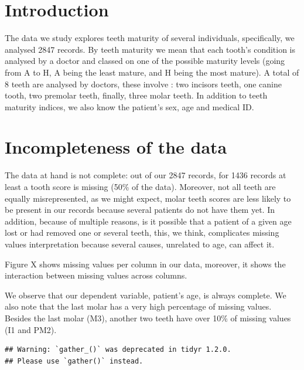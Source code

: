 \documentclass[11pt,]{article}
\begin{document}
\vskip -8.5pt



\noindent  

\hypertarget{introduction}{%
\section{Introduction}\label{introduction}}

The data we study explores teeth maturity of several individuals,
specifically, we analysed 2847 records. By teeth maturity we mean that
each tooth's condition is analysed by a doctor and classed on one of the
possible maturity levels (going from A to H, A being the least mature,
and H being the most mature). A total of 8 teeth are analysed by
doctors, these involve : two incisors teeth, one canine tooth, two
premolar teeth, finally, three molar teeth. In addition to teeth
maturity indices, we also know the patient's sex, age and medical ID.

\hypertarget{incompleteness-of-the-data}{%
\section{Incompleteness of the data}\label{incompleteness-of-the-data}}

The data at hand is not complete: out of our 2847 records, for 1436
records at least a tooth score is missing (50\% of the data). Moreover,
not all teeth are equally misrepresented, as we might expect, molar
teeth scores are less likely to be present in our records because
several patients do not have them yet. In addition, because of multiple
reasons, is it possible that a patient of a given age lost or had
removed one or several teeth, this, we think, complicates missing values
interpretation because several causes, unrelated to age, can affect it.

Figure X shows missing values per column in our data, moreover, it shows
the interaction between missing values across columns.

We observe that our dependent variable, patient's age, is always
complete. We also note that the last molar has a very high percentage of
missing values. Besides the last molar (M3), another two teeth have over
10\% of missing values (I1 and PM2).

\begin{verbatim}
## Warning: `gather_()` was deprecated in tidyr 1.2.0.
## Please use `gather()` instead.
\end{verbatim}
\end{document}
